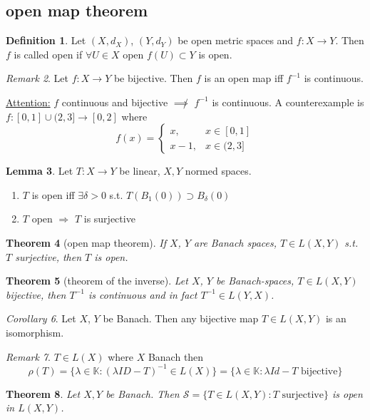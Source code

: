 \documentclass[a4paper, 12pt]{article}
\theoremstyle{plain}
\newtheorem{theorem}{Theorem}[subsection] %
\theoremstyle{definition}
\newtheorem{definition}[theorem]{Definition} %
\theoremstyle{lemma}
\newtheorem{lemma}[theorem]{Lemma}
\theoremstyle{remark}
\newtheorem{remark}[theorem]{Remark}
\theoremstyle{corollary}
\newtheorem{corollary}[theorem]{Corollary}
\theoremstyle{example}
\begin{document}
	\subsection{open map theorem}
	\begin{definition}
		Let $(X,d_X)$, $(Y,d_Y)$ be open metric spaces and $f: X \to Y$. Then $f$ is called open if $\forall U \in X$ open $f(U) \subset Y$ is open.
	\end{definition}
	\begin{remark}
		Let $f: X \to Y$ be bijective. Then $f$ is an open map iff $f^{-1}$ is continuous.
	\end{remark}
	\noindent\underline{Attention:} $f$ continuous and bijective $\not \implies$ $f^{-1}$ is continuous. A counterexample is $f: [0,1] \cup (2,3] \to [0,2]$ where \[f(x) = \begin{cases}
		x, & x \in [0,1]\\
		x-1, & x \in (2,3]
	\end{cases}\]
	\begin{lemma}
		Let $T: X \to Y$ be linear, $X,Y$ normed spaces. \begin{enumerate}
			\item $T$ is open iff $\exists \delta > 0$ s.t. $T(B_1(0)) \supset B_\delta(0)$
			\item $T$ open $\Rightarrow$ $T$ is surjective
		\end{enumerate}
	\end{lemma}
	\begin{theorem}[open map theorem]
		If $X$, $Y$ are Banach spaces, $T \in L(X,Y)$ s.t. $T$ surjective, then $T$ is open.
	\end{theorem}
	\begin{theorem}[theorem of the inverse]
		Let $X$, $Y$ be Banach-spaces, $T \in L(X,Y)$ bijective, then $T^{-1}$ is continuous and in fact $T^{-1} \in L(Y,X)$.
	\end{theorem}
	\begin{corollary}
		Let $X$, $Y$ be Banach. Then any bijective map $T\in L(X,Y)$ is an isomorphism.
	\end{corollary}
	\begin{remark}
		$T\in L(X)$ where $X$ Banach then \[\rho(T) = \{\lambda \in \mathbb{K}: (\lambda ID - T)^{-1} \in L(X)\} = \{\lambda \in \mathbb{K}: \lambda Id - T \text{ bijective}\}\]
	\end{remark}
	\begin{theorem}
		Let $X,Y$ be Banach. Then $\mathcal{S} = \{T \in L(X,Y): T \text{ surjective}\}$ is open in $L(X,Y)$.
	\end{theorem}
\end{document}
